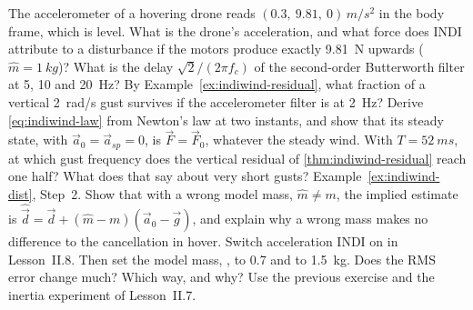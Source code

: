 \begin{exercises}
\exercise[1] The accelerometer of a hovering drone reads $(0.3,\ 9.81,\ 0)\,\si{m/s^2}$ in the body frame, which is level. What is the drone's acceleration, and what force does INDI attribute to a disturbance if the motors produce exactly \SI{9.81}{N} upwards ($\hat m = \SI{1}{kg}$)?
\exercise[1] What is the delay $\sqrt2/(2\pi f_c)$ of the second-order Butterworth filter at 5, 10 and \SI{20}{Hz}?
\exercise[1] By Example~\ref{ex:indiwind-residual}, what fraction of a vertical \SI{2}{rad/s} gust survives if the accelerometer filter is at \SI{2}{Hz}?
\exercise[2] Derive \cref{eq:indiwind-law} from Newton's law at two instants, and show that its steady state, with $\vec a_0 = \vec a_{sp} = 0$, is $\vec F = \vec F_0$, whatever the steady wind.
\exercise[2] With $T = \SI{52}{ms}$, at which gust frequency does the vertical residual of \cref{thm:indiwind-residual} reach one half? What does that say about very short gusts?
\exercise[2] Example~\ref{ex:indiwind-dist}, Step~2. Show that with a wrong model mass, $\hat m \ne m$, the implied estimate is $\hat{\vec d} = \vec d + (\hat m - m)(\vec a_0 - \vec g)$, and explain why a wrong mass makes no difference to the cancellation in hover.
\exercise[2] Switch acceleration INDI on in Lesson~II.8. Then set the model mass, , to 0.7 and to \SI{1.5}{kg}. Does the RMS error change much? Which way, and why? Use the previous exercise and the inertia experiment of Lesson~II.7.

\end{exercises}
